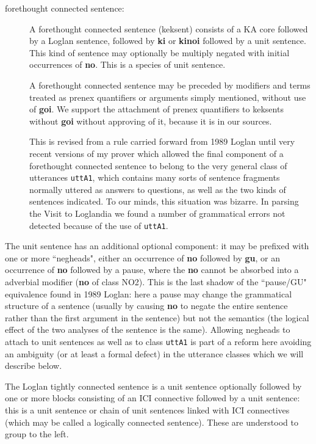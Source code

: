 \documentclass[12pt]{book}
\begin{document}
{\begin{description}
\item[forethought connected sentence:]  A forethought connected sentence (keksent) consists of a KA core followed by a Loglan sentence, followed by {\bf ki} or {\bf kinoi} followed by a unit sentence.  This kind of sentence may optionally be multiply negated with initial occurrences of {\bf no}.  This is a species of unit sentence.

A forethought connected sentence may be preceded by modifiers and terms treated as prenex quantifiers or arguments simply mentioned, without use of {\bf goi}.  We support the attachment of prenex quantifiers to keksents without {\bf goi} without approving of it, because it is in our sources.

This is revised from a rule carried forward from 1989 Loglan until very recent versions of my prover which allowed the final component of a forethought connected sentence to belong to the very general class of utterances {\tt uttA1}, which contains many sorts of sentence fragments normally uttered as answers to questions, as well as the two kinds of sentences indicated.  To our minds, this situation was bizarre.  In parsing the Visit to Loglandia we found a number of grammatical errors not detected because of the use of {\tt uttA1}.

\end{description}

The unit sentence has an additional optional component:  it may be prefixed with one or more ``negheads", either an occurrence of {\bf no} followed
by {\bf gu}, or an occurrence of {\bf no} followed by a pause, where the {\bf no} cannot be absorbed into a adverbial modifier ({\bf no} of class NO2).  This is the last shadow of the ``pause/GU" equivalence found in 1989 Loglan:  here a pause may change the grammatical structure of a sentence (usually by causing {\bf no}
to negate the entire sentence rather than the first argument in the sentence) but not the semantics (the logical effect of the two analyses of the sentence is the same).  Allowing negheads to attach to unit sentences as well as to class {\tt uttA1} is part of a reform here avoiding an ambiguity (or at least a formal defect) in the utterance classes which we will describe below.

The Loglan tightly connected sentence is  a unit sentence optionally followed by one or more blocks consisting of an ICI connective followed by a unit sentence:  this is a unit sentence or chain of unit sentences linked with ICI connectives (which may be called a logically connected sentence).  These are understood to group to the left.  

}
\end{document}
